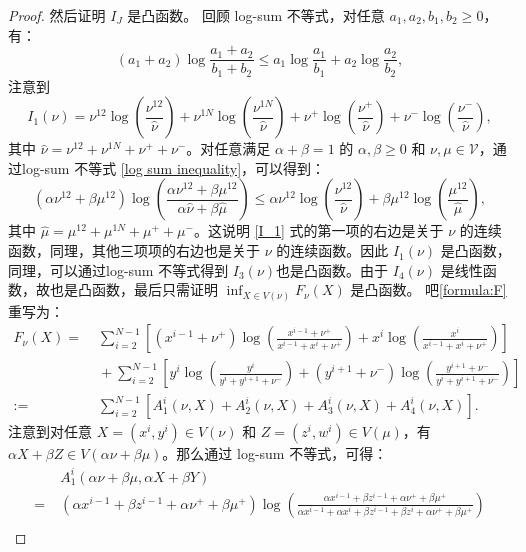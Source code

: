 \begin{appendices}
\begin{proof}
	然后证明 $I_J$ 是凸函数。 回顾 log-sum 不等式，对任意 $a_{1},a_{2},b_{1},b_{2}\ge 0$，有：
	\begin{equation}\label{log sum inequality}
		(a_1+a_2)\log \frac{a_1+a_2}{b_1+b_2}\le a_{1}\log \frac{a_{1}}{b_{1}}+a_{2}\log \frac{a_{2}}{b_{2}} ,
	\end{equation}
	注意到
	\begin{equation}\label{I_1}
		I_1(\nu) = \nu^{12}\log\left(\frac{\nu^{12}}{\hat{\nu}}\right)+\nu^{1N}\log\left(\frac{\nu^{1N}}{\hat{\nu}}\right)+\nu^{+}\log\left(\frac{\nu^{+}}{\hat{\nu}}\right)+\nu^{-}\log\left(\frac{\nu^{-}}{\hat{\nu}}\right),
	\end{equation}
	其中 $\hat{\nu}=\nu^{12}+\nu^{1N}+\nu^++\nu^-$。对任意满足 $\alpha+\beta=1$ 的 $\alpha,\beta\ge 0$ 和 $\nu,\mu\in \mathcal{V}$，通过log-sum 不等式 \eqref{log sum inequality}，可以得到：
	\begin{equation*}
		(\alpha \nu^{12}+\beta \mu^{12})\log\left(\frac{\alpha \nu^{12}+\beta \mu^{12}}{\alpha \hat{\nu}+\beta \hat{\mu}}\right)\le \alpha\nu^{12}\log\left(\frac{\nu^{12}}{\hat{\nu}}\right)+\beta\mu^{12}\log\left(\frac{\mu^{12}}{\hat{\mu}}\right),
	\end{equation*}
	其中 $\hat{\mu}=\mu^{12}+\mu^{1N}+\mu^++\mu^-$。这说明 \eqref{I_1} 式的第一项的右边是关于 $\nu$ 的连续函数，同理，其他三项项的右边也是关于 $\nu$ 的连续函数。因此 $I_1(\nu)$ 是凸函数，同理，可以通过log-sum 不等式得到 $I_3(\nu)$也是凸函数。由于 $I_4(\nu)$ 是线性函数，故也是凸函数，最后只需证明 $\inf_{X\in V(\nu)}F_{\nu}(X)$ 是凸函数。 吧\eqref{formula:F} 重写为：
	\begin{align*}
		F_{\nu}(X)=&\;\sum_{i=2}^{N-1}\left[(x^{i-1}+\nu^+)\log\left(\frac{x^{i-1}+\nu^+}{x^{i-1}+x^i+\nu^+}\right)+x^i\log\left(\frac{x^{i}}{x^{i-1}+x^i+\nu^+}\right)\right]\\
		&\;+\sum_{i=2}^{N-1}\left[y^i\log\left(\frac{y^{i}}{y^{i}+y^{i+1}+\nu^-}\right)+(y^{i+1}+\nu^-)\log\left(\frac{y^{i+1}+\nu^-}{y^{i}+y^{i+1}+\nu^-}\right)\right]\\
		:=&\;\sum_{i=2}^{N-1}[A_1^i(\nu,X)+A_2^i(\nu,X)+A_3^i(\nu,X)+A_4^i(\nu,X)].
	\end{align*}
	注意到对任意 $X=(x^i,y^i)\in V(\nu)$ 和 $Z=(z^i,w^i)\in V(\mu)$，有 $\alpha X+\beta Z\in V(\alpha\nu+\beta\mu)$。那么通过 log-sum 不等式，可得：
	\begin{align*}
		&\;A_1^i(\alpha\nu+\beta \mu,\alpha X+\beta Y)\\
		=&\;(\alpha x^{i-1}+\beta z^{i-1}+\alpha\nu^++\beta \mu^+ )\log\left(\frac{\alpha x^{i-1}+\beta z^{i-1}+\alpha\nu^++\beta \mu^+}{\alpha x^{i-1}+\alpha x^i+\beta z^{i-1}+\beta z^i+\alpha\nu^++\beta \mu^+}\right)\\

\end{align*}
\end{proof}
\end{appendices}
